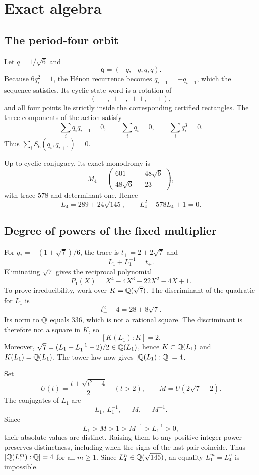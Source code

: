 \section{Exact algebra}
\label{app:algebra}

\subsection{The period-four orbit}

Let \(q=1/\sqrt6\) and
\[
 \mathbf q=(-q,-q,q,q).
\]
Because \(6q_i^2=1\), the H\'enon recurrence becomes
\(q_{i+1}=-q_{i-1}\), which the sequence satisfies.  Its cyclic state word is
a rotation of
\[
 (--,\,+-,\,++,\,-+),
\]
and all four points lie strictly inside the corresponding certified
rectangles.  The three components of the action satisfy
\[
 \sum_iq_iq_{i+1}=0,\qquad
 \sum_iq_i=0,\qquad
 \sum_iq_i^3=0.
\]
Thus \(\sum_iS_6(q_i,q_{i+1})=0\).

Up to cyclic conjugacy, its exact monodromy is
\[
 M_4=
 \begin{pmatrix}
 601&-48\sqrt6\\
 48\sqrt6&-23
 \end{pmatrix},
\]
with trace 578 and determinant one.  Hence
\[
 L_4=289+24\sqrt{145},\qquad
 L_4^2-578L_4+1=0.
\]

\subsection{Degree of powers of the fixed multiplier}

For \(q_*=-(1+\sqrt7)/6\), the trace is \(t_+=2+2\sqrt7\) and
\[
 L_1+L_1^{-1}=t_+.
\]
Eliminating \(\sqrt7\) gives the reciprocal polynomial
\[
 P_1(X)=X^4-4X^3-22X^2-4X+1.
\]
To prove irreducibility, work over \(K=\mathbb{Q}(\sqrt7)\).  The discriminant of the
quadratic for \(L_1\) is
\[
 t_+^2-4=28+8\sqrt7.
\]
Its norm to \(\mathbb{Q}\) equals \(336\), which is not a rational square.  The
discriminant is therefore not a square in \(K\), so
\[
 [K(L_1):K]=2.
\]
Moreover,
\(\sqrt7=(L_1+L_1^{-1}-2)/2\in\mathbb{Q}(L_1)\), hence
\(K\subset\mathbb{Q}(L_1)\) and \(K(L_1)=\mathbb{Q}(L_1)\).  The tower law now gives
\([\mathbb{Q}(L_1):\mathbb{Q}]=4\).

Set
\[
 U(t)=\frac{t+\sqrt{t^2-4}}2\quad(t>2),\qquad
 M=U(2\sqrt7-2).
\]
The conjugates of \(L_1\) are
\[
 L_1,\ L_1^{-1},\ -M,\ -M^{-1}.
\]
Since
\[
 L_1>M>1>M^{-1}>L_1^{-1}>0,
\]
their absolute values are distinct.  Raising them to any positive integer
power preserves distinctness, including when the signs of the last pair
coincide.  Thus \([\mathbb{Q}(L_1^m):\mathbb{Q}]=4\) for all \(m\ge1\).  Since
\(L_4^n\in\mathbb{Q}(\sqrt{145})\), an equality \(L_1^m=L_4^n\) is impossible.

